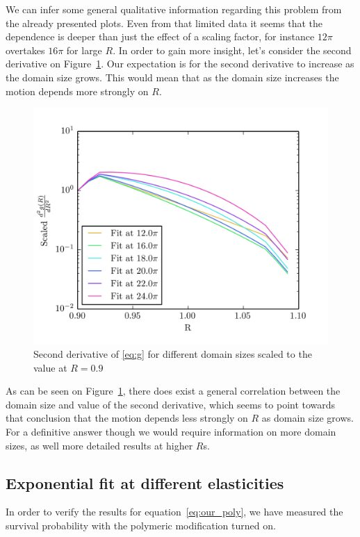 \documentclass[11pt,a4paper]{article}
\begin{document}
We can infer some general qualitative information regarding this problem from the already presented plots.
Even from that limited data it seems that the dependence is deeper than just the effect of a scaling factor, for instance $12\pi$ overtakes $16\pi$ for large $R$.
In order to gain more insight, let's consider the second derivative on Figure~\ref{img:2der}.
Our expectation is for the second derivative to increase as the domain size grows.
This would mean that as the domain size increases the motion depends more strongly on $R$.

\begin{figure}[H]
    \centering
    \includegraphics[width=\textwidth]{scaled_fit}
    \caption{Second derivative of \eqref{eq:g} for different domain sizes scaled to the value at $R=0.9$}\label{img:2der}
\end{figure}

As can be seen on Figure~\ref{img:2der}, there does exist a general correlation between the domain size and value of the second derivative, which seems to point towards that conclusion that the motion depends less strongly on $R$ as domain size grows.
For a definitive answer though we would require information on more domain sizes, as well more detailed results at higher $R$s.

\subsection{Exponential fit at different elasticities}
In order to verify the results for equation~\eqref{eq:our_poly}, we have measured the survival probability  with the polymeric modification turned on.
\end{document}
